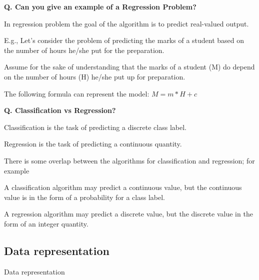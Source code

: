 \begin{frame}[fragile]{\textbf{Q. Can you give an example of a Regression Problem?}}
  \begin{wideitemize}
    \item In regression problem the goal of the algorithm is to predict real-valued output.
    \item E.g., Let’s consider the problem of predicting the marks of a student based on the number of hours he/she
    put for the preparation.
    \begin{wideitemize}
      \item Assume for the sake of understanding that the marks of a student (M) do depend on the number of hours (H) he/she put up for preparation.
      \item The following formula can represent the model: $M = m*H + c$
    \end{wideitemize}
  \end{wideitemize}
\end{frame}

\begin{frame}[fragile]{\textbf{Q. Classification vs Regression?}}
  \begin{wideitemize}
    \item Classification is the task of predicting a discrete class label.
    \item Regression is the task of predicting a continuous quantity.
    \item There is some overlap between the algorithms for classification and regression; for example
    \begin{wideitemize}
      \item A classification algorithm may predict a continuous value, but the continuous value is in the form of a probability for a class label.
      \item A regression algorithm may predict a discrete value, but the discrete value in the form of an integer quantity.
    \end{wideitemize}
  \end{wideitemize}
\end{frame}


\subsection{Data representation}
\begin{transitionsubframe}
  \begin{center}
    \Huge Data representation
  \end{center}
\end{transitionsubframe}

